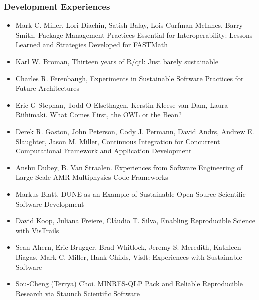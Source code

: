 \documentclass[11pt, oneside]{amsart}
\begin{document}
\subsubsection*{Development Experiences}

\begin{itemize}

\item Mark C. Miller, Lori Diachin, Satish Balay, Lois Curfman
  McInnes, Barry Smith. Package Management Practices Essential for
  Interoperability: Lessons Learned and Strategies Developed for
  FASTMath~\cite{Miller_WSSSPE}

\item Karl W. Broman, Thirteen years of R/qtl: Just barely sustainable~\cite{Broman_WSSSPE}

\item Charles R. Ferenbaugh, Experiments in Sustainable Software
  Practices for Future Architectures~\cite{Ferenbaugh_WSSSPE}

\item Eric G Stephan, Todd O Elsethagen, Kerstin Kleese van Dam, Laura
  Riihimaki. What Comes First, the OWL or the Bean?~\cite{Stephan_WSSSPE}

\item Derek R. Gaston, John Peterson, Cody J. Permann, David Andrs,
  Andrew E. Slaughter, Jason M. Miller, Continuous Integration for
  Concurrent Computational Framework and Application Development~\cite{Gaston_WSSSPE}

\item Anshu Dubey, B. Van Straalen. Experiences from Software
  Engineering of Large Scale AMR Multiphysics Code Frameworks~\cite{Dubey_WSSSPE}

\item Markus Blatt. DUNE as an Example of Sustainable Open Source
  Scientific Software Development~\cite{Blatt_WSSSPE}

\item David Koop, Juliana Freiere, Cl\'{a}udio T. Silva, Enabling
  Reproducible Science with VisTrails~\cite{Koop_WSSSPE}

\item Sean Ahern, Eric Brugger, Brad Whitlock, Jeremy S. Meredith,
  Kathleen Biagas, Mark C. Miller, Hank Childs, VisIt: Experiences
  with Sustainable Software~\cite{Ahern_WSSSPE}

\item Sou-Cheng (Terrya) Choi. MINRES-QLP Pack and Reliable
  Reproducible Research via Staunch Scientific Software~\cite{Choi_WSSSPE}


\end{itemize}
\end{document}
